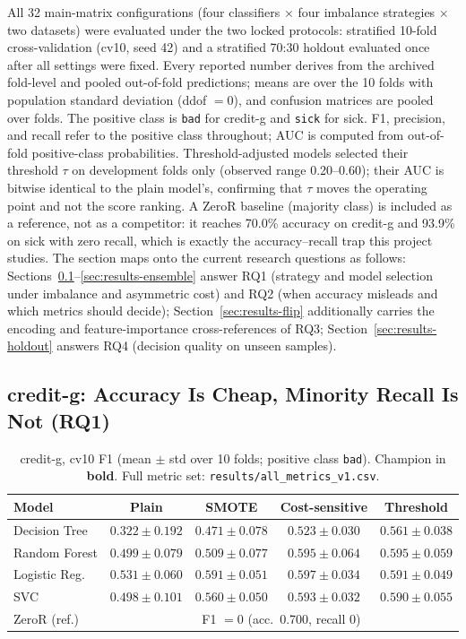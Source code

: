 All 32 main-matrix configurations (four classifiers $\times$ four imbalance strategies $\times$ two datasets) were evaluated under the two locked protocols: stratified 10-fold cross-validation (cv10, seed 42) and a stratified 70:30 holdout evaluated once after all settings were fixed. Every reported number derives from the archived fold-level and pooled out-of-fold predictions; means are over the 10 folds with population standard deviation (ddof $=0$), and confusion matrices are pooled over folds. The positive class is \texttt{bad} for credit-g and \texttt{sick} for sick. F1, precision, and recall refer to the positive class throughout; AUC is computed from out-of-fold positive-class probabilities. Threshold-adjusted models selected their threshold $\tau$ on development folds only (observed range 0.20--0.60); their AUC is bitwise identical to the plain model's, confirming that $\tau$ moves the operating point and not the score ranking. A ZeroR baseline (majority class) is included as a reference, not as a competitor: it reaches 70.0\% accuracy on credit-g and 93.9\% on sick with zero recall, which is exactly the accuracy--recall trap this project studies. The section maps onto the current research questions as follows: Sections~\ref{sec:results-creditg}--\ref{sec:results-ensemble} answer RQ1 (strategy and model selection under imbalance and asymmetric cost) and RQ2 (when accuracy misleads and which metrics should decide); Section~\ref{sec:results-flip} additionally carries the encoding and feature-importance cross-references of RQ3; Section~\ref{sec:results-holdout} answers RQ4 (decision quality on unseen samples).

\subsection{credit-g: Accuracy Is Cheap, Minority Recall Is Not (RQ1)}
\label{sec:results-creditg}

\begin{table}[H]
\centering
\caption{credit-g, cv10 F1 (mean $\pm$ std over 10 folds; positive class \texttt{bad}). Champion in \textbf{bold}. Full metric set: \texttt{results/all\_metrics\_v1.csv}.}
\label{tab:creditg-f1}
\begin{tabular}{lcccc}
\toprule
Model & Plain & SMOTE & Cost-sensitive & Threshold \\
\midrule
Decision Tree & $0.322\pm0.192$ & $0.471\pm0.078$ & $0.523\pm0.030$ & $0.561\pm0.038$ \\
Random Forest & $0.499\pm0.079$ & $0.509\pm0.077$ & $0.595\pm0.064$ & $0.595\pm0.059$ \\
Logistic Reg. & $0.531\pm0.060$ & $0.591\pm0.051$ & $\mathbf{0.597\pm0.034}$ & $0.591\pm0.049$ \\
SVC & $0.498\pm0.101$ & $0.560\pm0.050$ & $0.593\pm0.032$ & $0.590\pm0.055$ \\
\midrule
ZeroR (ref.) & \multicolumn{4}{c}{F1 $=0$ (acc.\ 0.700, recall 0)} \\
\bottomrule
\end{tabular}
\end{table}


